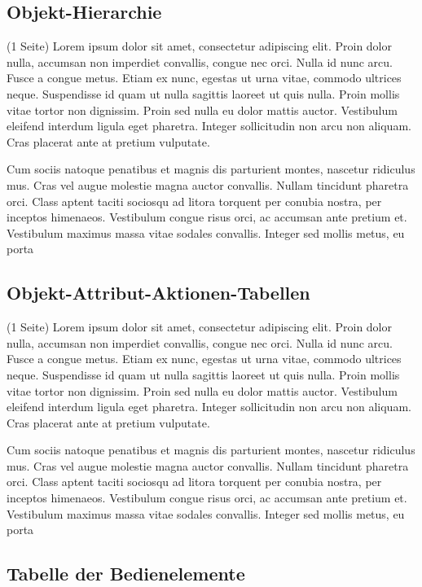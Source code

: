 \clearpage
\subsection{Objekt-Hierarchie}
\label{sec:objekthierarchie}

(1 Seite)
Lorem ipsum dolor sit amet, consectetur adipiscing elit. Proin dolor nulla, accumsan non imperdiet convallis, congue nec orci. Nulla id nunc arcu. Fusce a congue metus. Etiam ex nunc, egestas ut urna vitae, commodo ultrices neque. Suspendisse id quam ut nulla sagittis laoreet ut quis nulla. Proin mollis vitae tortor non dignissim. Proin sed nulla eu dolor mattis auctor. Vestibulum eleifend interdum ligula eget pharetra. Integer sollicitudin non arcu non aliquam. Cras placerat ante at pretium vulputate.

Cum sociis natoque penatibus et magnis dis parturient montes, nascetur ridiculus mus. Cras vel augue molestie magna auctor convallis. Nullam tincidunt pharetra orci. Class aptent taciti sociosqu ad litora torquent per conubia nostra, per inceptos himenaeos. Vestibulum congue risus orci, ac accumsan ante pretium et. Vestibulum maximus massa vitae sodales convallis. Integer sed mollis metus, eu porta

\clearpage
\subsection{Objekt-Attribut-Aktionen-Tabellen}
\label{sec:objektattribut}

(1 Seite)
Lorem ipsum dolor sit amet, consectetur adipiscing elit. Proin dolor nulla, accumsan non imperdiet convallis, congue nec orci. Nulla id nunc arcu. Fusce a congue metus. Etiam ex nunc, egestas ut urna vitae, commodo ultrices neque. Suspendisse id quam ut nulla sagittis laoreet ut quis nulla. Proin mollis vitae tortor non dignissim. Proin sed nulla eu dolor mattis auctor. Vestibulum eleifend interdum ligula eget pharetra. Integer sollicitudin non arcu non aliquam. Cras placerat ante at pretium vulputate.

Cum sociis natoque penatibus et magnis dis parturient montes, nascetur ridiculus mus. Cras vel augue molestie magna auctor convallis. Nullam tincidunt pharetra orci. Class aptent taciti sociosqu ad litora torquent per conubia nostra, per inceptos himenaeos. Vestibulum congue risus orci, ac accumsan ante pretium et. Vestibulum maximus massa vitae sodales convallis. Integer sed mollis metus, eu porta

\clearpage
\subsection{Tabelle der Bedienelemente}
\label{sec:bedienelemente}

